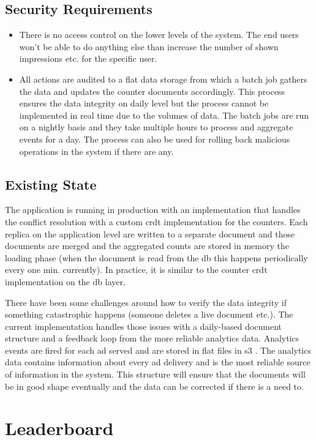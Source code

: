 \documentclass[11pt,a4paper]{report}
\begin{document}
\subsection{Security Requirements}
\begin{itemize}
\item There is no access control on the lower levels of the system. The end users won't be able to do anything else than increase the number of shown impressions etc. for the specific user.
\item All actions are audited to a flat data storage from which a batch job gathers the data and updates the counter documents accordingly. This process ensures the data integrity on daily level but the process cannot be implemented in real time due to the volumes of data. The batch jobs are run on a nightly basis and they take multiple hours to process and aggregate events for a day.  The process can also be used for rolling back malicious operations in the system if there are any.
\end{itemize}

\subsection{Existing State}
The application is running in production with an implementation that handles the conflict resolution with a custom \gls{crdt} implementation for the counters. Each replica on the application level are written to a separate document and those documents are merged and the aggregated counts are stored in memory the loading phase (when the document is read from the \gls{db} this happens periodically every one min. currently). In practice, it is similar to the counter \gls{crdt} implementation on the \gls{db} layer.

There have been some challenges around how to verify the data integrity if something catastrophic happens (someone deletes a live document etc.). The current implementation handles those issues with a daily-based document structure and a feedback loop from the more reliable analytics data. Analytics events are fired for each ad served and are stored in flat files in s3 . The analytics data contains information about every ad delivery and is the most reliable source of information in the system. This structure will ensure that the documents will be in good shape eventually and the data can be corrected if there is a need to.



\section{Leaderboard}
\end{document}
